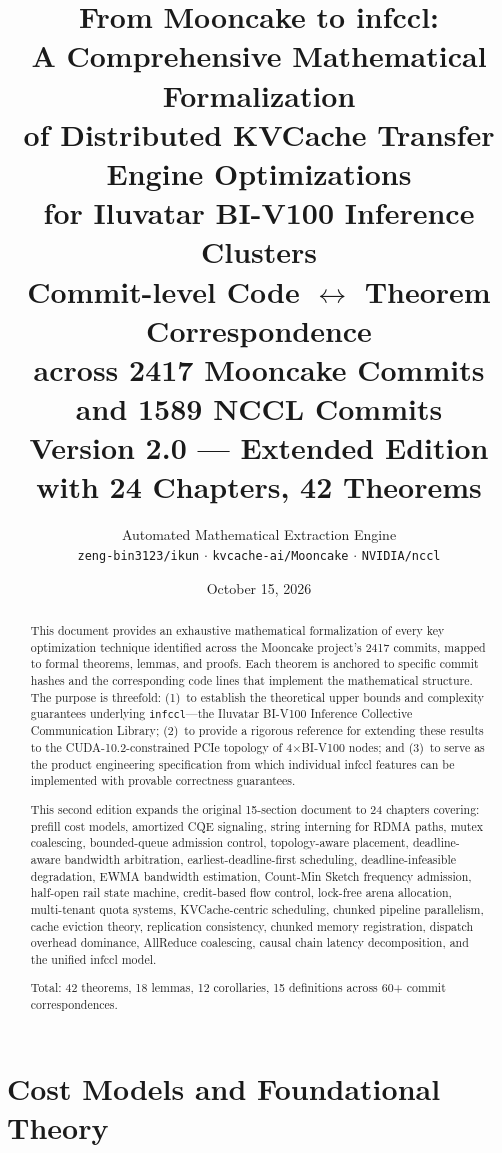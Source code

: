 \documentclass[11pt,a4paper,twoside]{article}
\title{%
  \vspace{-1.5cm}
  \textbf{From Mooncake to infccl:}\\[4pt]
  \textbf{A Comprehensive Mathematical Formalization}\\[4pt]
  \textbf{of Distributed KVCache Transfer Engine Optimizations}\\[4pt]
  \textbf{for Iluvatar BI-V100 Inference Clusters}\\[12pt]
  \large{Commit-level Code $\longleftrightarrow$ Theorem Correspondence}\\[4pt]
  \large{across 2417 Mooncake Commits and 1589 NCCL Commits}\\[8pt]
  \normalsize{Version 2.0 --- Extended Edition with 24 Chapters, 42 Theorems}
}
\author{
  Automated Mathematical Extraction Engine\\
  \texttt{zeng-bin3123/ikun} $\cdot$ \texttt{kvcache-ai/Mooncake} $\cdot$ \texttt{NVIDIA/nccl}
}
\date{October 15, 2026}
\theoremstyle{plain}
\theoremstyle{definition}
\theoremstyle{remark}
\begin{document}
\maketitle
\thispagestyle{empty}

\begin{abstract}
This document provides an exhaustive mathematical formalization of every key optimization
technique identified across the Mooncake project's 2417 commits, mapped to formal theorems,
lemmas, and proofs.  Each theorem is anchored to specific commit hashes and the corresponding
code lines that implement the mathematical structure.  The purpose is threefold:
(1)~to establish the theoretical upper bounds and complexity guarantees underlying
\texttt{infccl}---the Iluvatar BI-V100 Inference Collective Communication Library;
(2)~to provide a rigorous reference for extending these results to the CUDA-10.2-constrained
PCIe topology of 4$\times$BI-V100 nodes; and
(3)~to serve as the product engineering specification from which individual infccl features
can be implemented with provable correctness guarantees.

This second edition expands the original 15-section document to 24 chapters covering:
prefill cost models, amortized CQE signaling, string interning for RDMA paths, mutex
coalescing, bounded-queue admission control, topology-aware placement, deadline-aware
bandwidth arbitration, earliest-deadline-first scheduling, deadline-infeasible degradation,
EWMA bandwidth estimation, Count-Min Sketch frequency admission, half-open rail state
machine, credit-based flow control, lock-free arena allocation, multi-tenant quota systems,
KVCache-centric scheduling, chunked pipeline parallelism, cache eviction theory,
replication consistency, chunked memory registration, dispatch overhead dominance,
AllReduce coalescing, causal chain latency decomposition, and the unified infccl model.

Total: 42 theorems, 18 lemmas, 12 corollaries, 15 definitions across 60+ commit
correspondences.
\end{abstract}

\tableofcontents
\newpage



\part{Cost Models and Foundational Theory}
\end{document}
